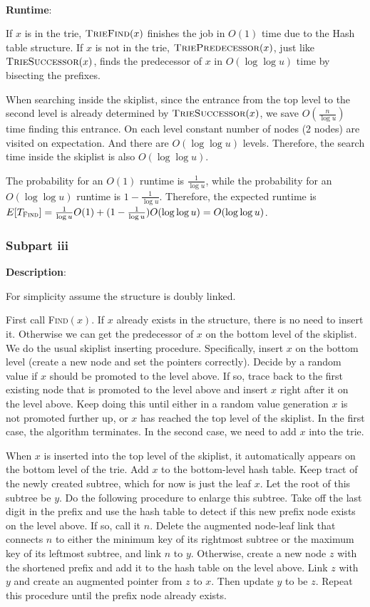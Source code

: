 \documentclass{article}
\begin{document}
~

\noindent\textbf{Runtime}:

If $x$ is in the trie, $\textsc{TrieFind}(x)$ finishes the job in $O(1)$ time due to the Hash table structure. If $x$ is not in the trie, $\textsc{TriePredecessor}(x)$, just like $\textsc{TrieSuccessor}(x)$, finds the predecessor of $x$ in $O(\log\log u)$ time by bisecting the prefixes.

When searching inside the skiplist, since the entrance from the top level to the second level is already determined by $\textsc{TrieSuccessor}(x)$, we save $O(\frac{n}{\log u})$ time finding this entrance. On each level constant number of nodes (2 nodes) are visited on expectation. And there are $O(\log\log u)$ levels. Therefore, the search time inside the skiplist is also $O(\log\log u)$.

The probability for an $O(1)$ runtime is $\frac{1}{\log u}$, while the probability for an $O(\log\log u)$ runtime is $1-\frac{1}{\log u}$. Therefore, the expected runtime is $E[T_\textsc{Find}]=\frac{1}{\log u}O(1)+(1-\frac{1}{\log u})O(\log\log u)=O(\log\log u)$.


\subsubsection{Subpart iii}
\noindent\textbf{Description}:

For simplicity assume the structure is doubly linked.

First call \textsc{Find}$(x)$. If $x$ already exists in the structure, there is no need to insert it. Otherwise we can get the predecessor of $x$ on the bottom level of the skiplist. We do the usual skiplist inserting procedure. Specifically, insert $x$ on the bottom level (create a new node and set the pointers correctly). Decide by a random value if $x$ should be promoted to the level above. If so, trace back to the first existing node that is promoted to the level above and insert $x$ right after it on the level above. Keep doing this until either in a random value generation $x$ is not promoted further up, or $x$ has reached the top level of the skiplist. In the first case, the algorithm terminates. In the second case, we need to add $x$ into the trie.

When $x$ is inserted into the top level of the skiplist, it automatically appears on the bottom level of the trie. Add $x$ to the bottom-level hash table. Keep tract of the newly created subtree, which for now is just the leaf $x$. Let the root of this subtree be $y$. Do the following procedure to enlarge this subtree. Take off the last digit in the prefix and use the hash table to detect if this new prefix node exists on the level above. If so, call it $n$. Delete the augmented node-leaf link that connects $n$ to either the minimum key of its rightmost subtree or the maximum key of its leftmost subtree, and link $n$ to $y$. Otherwise, create a new node $z$ with the shortened prefix and add it to the hash table on the level above. Link $z$ with $y$ and create an augmented pointer from $z$ to $x$. Then update $y$ to be $z$. Repeat this procedure until the prefix node already exists.
\end{document}
